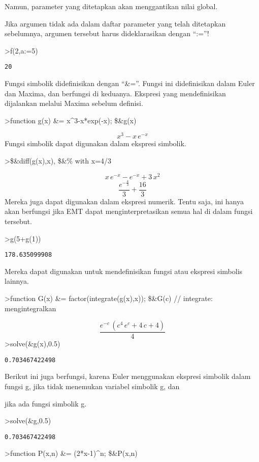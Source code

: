 \documentclass[
]{book}
\begin{document}
Namun, parameter yang ditetapkan akan menggantikan nilai global.

Jika argumen tidak ada dalam daftar parameter yang telah ditetapkan sebelumnya, argumen tersebut harus dideklarasikan dengan ``:=''!

\textgreater f(2,a:=5)

\begin{verbatim}
20
\end{verbatim}

Fungsi simbolik didefinisikan dengan ``\&=''. Fungsi ini didefinisikan dalam Euler dan Maxima, dan berfungsi di keduanya. Ekspresi yang mendefinisikan dijalankan melalui Maxima sebelum definisi.

\textgreater function g(x) \&= x\^{}3-x*exp(-x); \$\&g(x)

\[x^3-x\,e^ {- x }\]Fungsi simbolik dapat digunakan dalam ekspresi simbolik.

\textgreater\$\&diff(g(x),x), \$\&\% with x=4/3

\[x\,e^ {- x }-e^ {- x }+3\,x^2\]\[\frac{e^ {- \frac{4}{3} }}{3}+\frac{16}{3}\]Mereka juga dapat digunakan dalam ekspresi numerik. Tentu saja, ini hanya akan berfungsi jika EMT dapat menginterpretasikan semua hal di dalam fungsi tersebut.

\textgreater g(5+g(1))

\begin{verbatim}
178.635099908
\end{verbatim}

Mereka dapat digunakan untuk mendefinisikan fungsi atau ekspresi simbolis lainnya.

\textgreater function G(x) \&= factor(integrate(g(x),x)); \$\&G(c) // integrate: mengintegralkan

\[\frac{e^ {- c }\,\left(c^4\,e^{c}+4\,c+4\right)}{4}\]\textgreater solve(\&g(x),0.5)

\begin{verbatim}
0.703467422498
\end{verbatim}

Berikut ini juga berfungsi, karena Euler menggunakan ekspresi simbolik dalam fungsi g, jika tidak menemukan variabel simbolik g, dan

jika ada fungsi simbolik g.

\textgreater solve(\&g,0.5)

\begin{verbatim}
0.703467422498
\end{verbatim}

\textgreater function P(x,n) \&= (2*x-1)\^{}n; \$\&P(x,n)
\end{document}
